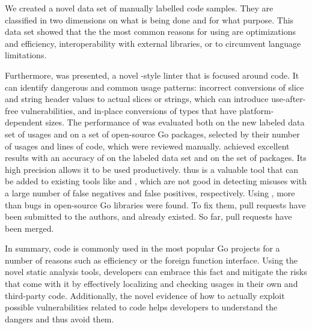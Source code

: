 We created a novel data set of \numberLabeledCodeSnippets{} manually labelled \unsafe{} code samples.
They are classified in two dimensions on what is being done and for what purpose.
This data set showed that the the most common reasons for using \unsafe{} are optimizations and efficiency,
interoperability with external libraries, or to circumvent language limitations.

Furthermore, \toolSafer{} was presented, a novel \toolVet{}-style linter that is focused around \unsafe{} code.
It can identify  dangerous and common usage patterns: incorrect conversions of slice and string header
values to actual slices or strings, which can introduce use-after-free vulnerabilities, and in-place conversions of
types that have platform-dependent sizes.
The performance of \toolSafer{} was evaluated both on the new labeled data set of \unsafe{} usages and on a set of
open-source Go packages, selected by their number of \unsafe{} usages and lines of code, which were reviewed manually.
\toolSafer{} achieved excellent results with an accuracy of \goSaferEvaluationDatasetGosaferAccuracy{} on the labeled
data set and \goSaferEvaluationPackagesGosaferAccuracy{} on the set of packages.
Its high precision allows it to be used productively.
\toolSafer{} thus is a valuable tool that can be added to existing tools like \toolVet{} and \toolGosec{}, which are
not good in detecting \unsafe{} misuses with a large number of false negatives and false positives, respectively.
Using \toolSafer{}, more than \numberBugsFixedRounded{} bugs in open-source Go libraries were found.
To fix them, \numberPRs{} pull requests have been submitted to the authors, and  already existed.
So far, \numberPRsMerged{} pull requests have been merged.

In summary, \unsafe{} code is commonly used in the most popular Go projects for a number of reasons such as efficiency
or the foreign function interface.
Using the novel static analysis tools, developers can embrace this fact and mitigate the risks that come with it by
effectively localizing and checking \unsafe{} usages in their own and third-party code.
Additionally, the novel evidence of how to actually exploit possible vulnerabilities related to \unsafe{} code helps
developers to understand the dangers and thus avoid them.
